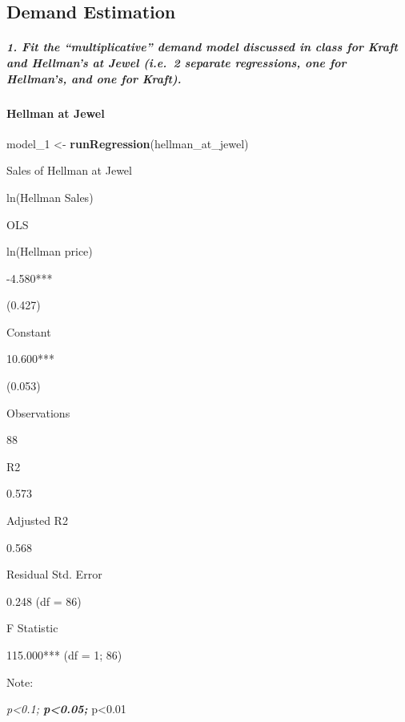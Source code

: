 \documentclass[]{article}
\newenvironment{Shaded}{\begin{snugshade}}{\end{snugshade}}
\newcommand{\DecValTok}[1]{\textcolor[rgb]{0.00,0.00,0.81}{#1}}
\newcommand{\KeywordTok}[1]{\textcolor[rgb]{0.13,0.29,0.53}{\textbf{#1}}}
\newcommand{\NormalTok}[1]{#1}
\newcommand{\StringTok}[1]{\textcolor[rgb]{0.31,0.60,0.02}{#1}}
\let\oldparagraph\paragraph
\renewcommand{\paragraph}[1]{\oldparagraph{#1}\mbox{}}
\let\oldsubparagraph\subparagraph
\renewcommand{\subparagraph}[1]{\oldsubparagraph{#1}\mbox{}}
\begin{document}
\hypertarget{demand-estimation}{%
\subsection{Demand Estimation}\label{demand-estimation}}

\hypertarget{fit-the-multiplicative-demand-model-discussed-in-class-for-kraft-and-hellmans-at-jewel-i.e.2-separate-regressions-one-for-hellmans-and-one-for-kraft.}{%
\subparagraph{1. Fit the ``multiplicative'' demand model discussed in
class for Kraft and Hellman's at Jewel (i.e.~2 separate regressions, one
for Hellman's, and one for
Kraft).}\label{fit-the-multiplicative-demand-model-discussed-in-class-for-kraft-and-hellmans-at-jewel-i.e.2-separate-regressions-one-for-hellmans-and-one-for-kraft.}}

\hypertarget{hellman-at-jewel}{%
\paragraph{Hellman at Jewel}\label{hellman-at-jewel}}

\begin{Shaded}
\begin{Highlighting}[]
\NormalTok{model_}\DecValTok{1}\NormalTok{ <-}\StringTok{ }\KeywordTok{runRegression}\NormalTok{(hellman_at_jewel)}
\end{Highlighting}
\end{Shaded}

Sales of Hellman at Jewel

ln(Hellman Sales)

OLS

ln(Hellman price)

-4.580***

(0.427)

Constant

10.600***

(0.053)

Observations

88

R2

0.573

Adjusted R2

0.568

Residual Std. Error

0.248 (df = 86)

F Statistic

115.000*** (df = 1; 86)

Note:

\emph{p\textless{}0.1; \textbf{p\textless{}0.05; }}p\textless{}0.01
\end{document}
